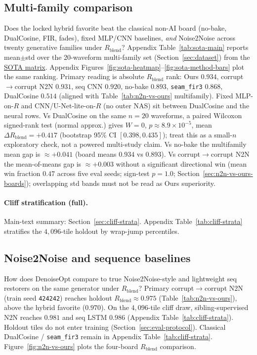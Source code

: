 \subsection{Multi-family comparison}
\label{sec:sota-main}

Does the locked hybrid favorite beat the classical non-AI board (no-bake, DualCosine, FIR, fades),
fixed MLP/CNN baselines, \emph{and} Noise2Noise across twenty generative families under $R_{\mathrm{blend}}$?
Appendix Table~\ref{tab:sota-main} reports mean$\pm$std over the 20-waveform multi-family set (Section~\ref{sec:dataset}) from the \href{https://github.com/reeldemo/denoise-opt}{SOTA matrix}.
Appendix Figures~\ref{fig:sota-heatmap}--\ref{fig:sota-method-bars} plot the same ranking.
Primary reading is absolute $R_{\mathrm{blend}}$ rank:
Ours $0.934$, corrupt$\to$corrupt N2N $0.931$, seq CNN $0.920$, no-bake $0.893$,
\texttt{seam\_fir3} $0.868$, DualCosine $0.514$
(aligned with Table~\ref{tab:n2n-vs-ours} multifamily).
Fixed MLP-on-$R$ and CNN/U-Net-lite-on-$R$ (no outer NAS) sit between DualCosine and the neural rows.
Vs DualCosine on the same $n{=}20$ waveforms, a paired Wilcoxon signed-rank test (normal approx.) gives $W{=}0$, $p{\approx}8.9{\times}10^{-5}$, mean $\Delta R_{\mathrm{blend}}{=}{+}0.417$ (bootstrap 95\% CI $[0.398,0.435]$); treat this as a small-$n$ exploratory check, not a powered multi-study claim.
Vs no-bake the multifamily mean gap is $\approx{+}0.041$ (board means $0.934$ vs $0.893$).
Vs corrupt$\to$corrupt N2N the mean-of-means gap is $\approx{+}0.003$ without a significant directional win (mean win fraction $0.47$ across five eval seeds; sign-test $p{=}1.0$; Section~\ref{sec:n2n-vs-ours-boards}); overlapping std bands must not be read as Ours superiority.

\paragraph{Cliff stratification (full).}
Main-text summary: Section~\ref{sec:cliff-strata}.
Appendix Table~\ref{tab:cliff-strata} stratifies the $4{,}096$-tile holdout by wrap-jump percentiles.

\subsection{Noise2Noise and sequence baselines}
\label{sec:n2n-baselines}

How does DenoiseOpt compare to true Noise2Noise-style and lightweight seq restorers on the same generator under $R_{\mathrm{blend}}$?
Primary corrupt$\to$corrupt N2N (train seed \texttt{424242}) reaches holdout $R_{\mathrm{blend}}\approx 0.975$ (Table~\ref{tab:n2n-vs-ours}), above the hybrid favorite ($0.970$).
On the $4{,}096$-tile cliff draw, sibling-supervised N2N reaches $0.981$ and seq LSTM $0.986$ (Appendix Table~\ref{tab:cliff-strata}).
Holdout tiles do not enter training (Section~\ref{sec:eval-protocol}).
Classical DualCosine / \texttt{seam\_fir3} remain in Appendix Table~\ref{tab:cliff-strata}.
Figure~\ref{fig:n2n-vs-ours} plots the four-board $R_{\mathrm{blend}}$ comparison.

